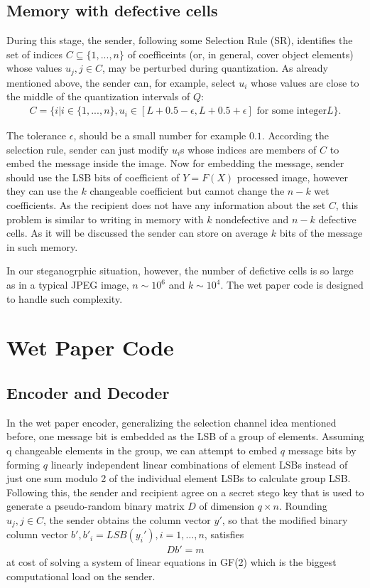 \subsection{Memory with defective cells}
\label{ChapAlgSecPertSubMem}

During this stage, the sender, following some Selection Rule (SR), identifies the set of indices $C \subseteq \{1, ... , n\}$ of coefficeints (or, in general, cover object elements) whose values $u_j, j\in C$, may be perturbed during quantization. As already mentioned above, the sender can, for example, select $u_i$ whose values are close to the middle of the quantization intervals of $Q$:
\begin{eqnarray*}
C = \{i | i \in \{1,..., n\}, u_i \in [L + 0.5 - \epsilon, L + 0.5 + \epsilon] \textrm{ for some integer} L\}. 
\end{eqnarray*}

The tolerance $\epsilon$, should be a small number for example $0.1$. According the selection rule, sender can just modify $u_i$s whose indices are members of $C$ to embed the message inside the image. Now for embedding the message, sender should use the LSB bits of coefficient of $Y = F(X)$ processed image, however they can use the $k$ changeable coefficient but cannot change the $n - k$ wet coefficients. As the recipient does not have any information about the set $C$, this problem is similar to writing in memory with $k$ nondefective and $n - k$ defective cells. As it will be discussed the sender can store on average $k$ bits of the message in such memory.

In our steganogrphic situation, however, the number of defictive cells is so large as in a typical JPEG image, $n \sim 10^6$ and $k \sim 10^4$. The wet paper code is designed to handle such complexity.

\section{Wet Paper Code}
\subsection{Encoder and Decoder}

In the wet paper encoder, generalizing the selection channel idea 
mentioned before, one message bit is embedded as the LSB of a group 
of elements. Assuming q changeable elements in the group, we can 
attempt to embed $q$ message bits by forming $q$ linearly independent linear
combinations of element LSBs instead of just one sum modulo 2 of the 
individual element LSBs to calculate group LSB. Following this, the 
sender and recipient agree on a secret stego key that is used to generate 
a pseudo-random binary matrix $D$ of dimension $q\times n$. Rounding $u_j, 
j\in C$, the sender obtains the column vector $y'$, so that 
the modified binary column vector $b', b'_i = LSB(y_i'), i=1, \dots , n$, 
satisfies
\begin{eqnarray}
 Db' = m
\label{em}
\end{eqnarray} 
at cost of solving a system of linear equations in
GF(2) which is the biggest computational load on the sender.

